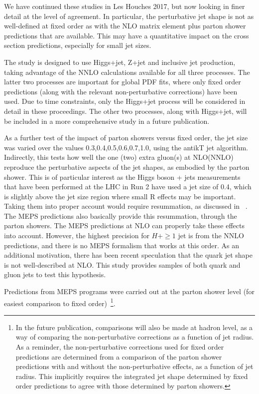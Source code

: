 \documentclass[aps,prd,twocolumn,fleqn,superscriptaddress,groupedaddress,nofootinbib,preprintnumbers,nobalancelastpage]{revtex4}
\begin{document}
We have continued these studies in Les Houches 2017, but now looking in finer detail at 
the level of agreement. In particular, the perturbative jet shape is not as
well-defined at fixed order as with the NLO matrix element plus parton shower
predictions that are available. This may have a quantitative impact on the cross
section predictions, especially for small jet sizes.   

The study is designed to use Higgs+jet, Z+jet and inclusive jet production,
taking advantage of the NNLO calculations available for all three processes.
The latter two processes are important for global PDF fits, where
only fixed order predictions (along with the relevant non-perturbative
corrections) have been used. 
Due to time constraints, only the Higgs+jet process will be considered in detail
in these proceedings. The other two processes, along with Higgs+jet,  will be
included in a more comprehensive study in a future publication. 

As a  further test of the impact of parton showers versus fixed order, the jet
size was varied over the values 0.3,0.4,0.5,0.6,0.7,1.0, using the antikT jet
algorithm. Indirectly, this tests how well the one (two) extra gluon(s) at
NLO(NNLO) reproduce the perturbative aspects of the jet shapes, as embodied by
the parton shower. This is of particular interest as the Higgs boson + jets measurements that have been performed at the LHC in Run 2 have used a jet size of 0.4, which is 
slightly above the jet size region where small R effects may be important. Taking them into proper account would require resummation, as discussed in ~\cite{}. The MEPS predictions also basically provide this resummation, through the parton showers. The 
MEPS predictions at NLO can properly take these effects into account. However, the highest precision for $H+\ge1$ jet is from the NNLO predictions, and there is no MEPS formalism that works at this order.   As an additional motivation, there has been recent speculation that the quark jet shape is
not well-described at NLO. This study provides samples of both quark and gluon
jets to test this hypothesis.

  Predictions from MEPS programs were carried out
at the parton shower level (for easiest comparison to fixed order)~\footnote{In
the future publication, comparisons will also be made at hadron level, as a way
of comparing the non-perturbative corrections as a function of jet radius.  As a
reminder, the non-perturbative corrections used for fixed order predictions are
determined from a comparison of the parton shower predictions with and without
the non-perturbative effects, as a function of jet radius. This implicitly
requires the integrated jet shape determined by fixed order predictions to agree
with those determined by parton showers.}.
\end{document}

